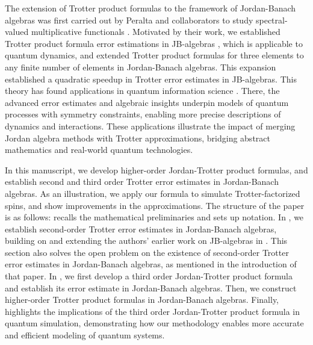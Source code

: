 \documentclass{article}
\theoremstyle{plain} %
\numberwithin{equation}{section}
\begin{document}
The extension of Trotter product formulas to the framework of Jordan-Banach algebras was first carried out by Peralta and collaborators to study spectral-valued multiplicative functionals \cite{ escolano:peralta:villena:2024:lie}. 
Motivated by their work, we established Trotter product formula error estimations in JB-algebras \cite{chehade:wang:wang:2024:suzuki}, which is applicable to quantum dynamics, and extended Trotter product formulas for three elements to any finite number of elements in Jordan-Banach algebras. This expansion established a quadratic speedup in Trotter error estimates in JB-algebras. This theory has found applications in quantum information science \cite{wang:chehade:dumitrescu:2024:semi}. There, the advanced error estimates and algebraic insights underpin models of quantum processes with symmetry constraints, enabling more precise descriptions of dynamics and interactions. These applications illustrate the impact of merging Jordan algebra methods with Trotter approximations, bridging abstract mathematics and real-world quantum technologies.

In this manuscript, 
we develop higher-order Jordan-Trotter product formulas, 
and establish second and third order Trotter error estimates in Jordan-Banach algebras. 
As an illustration, we apply our formula to simulate Trotter-factorized spins, and show improvements in the approximations. The structure of the paper is as follows:  recalls the mathematical preliminaries and sets up notation. In , we establish second-order Trotter error estimates in Jordan-Banach algebras, building on and extending the authors' earlier work on JB-algebras in \cite{chehade:wang:wang:2024:suzuki}. This section also solves the open problem on the existence of second-order Trotter error estimates in Jordan-Banach algebras, as mentioned in the introduction of that paper. In , we first develop a third order Jordan-Trotter product formula and establish its error estimate in Jordan-Banach algebras. Then, we construct higher-order Trotter product formulas in Jordan-Banach algebras. Finally,  highlights the implications of the third order Jordan-Trotter product formula in quantum simulation, demonstrating how our methodology enables more accurate and efficient modeling of quantum systems.
\end{document}
